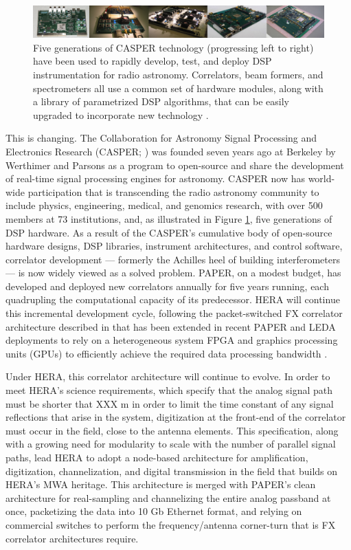 \documentclass[preprint]{aastex}
\begin{document}
\begin{figure}[!ht]\centering
\includegraphics[width=6.5in]{plots/casper_boards.jpg}
\caption{
Five generations of CASPER technology (progressing left to right) have been used to rapidly
develop, test, and deploy DSP instrumentation for radio astronomy.  Correlators,
beam formers, and spectrometers all use a common set of hardware modules, along with a library
of parametrized DSP algorithms, that can be easily upgraded to incorporate new technology
\citep{parsons_et_al2006,parsons_et_al2008}.
}\label{fig:casper_boards}
\end{figure}

This is changing.  The Collaboration for Astronomy Signal Processing and Electronics Research
(CASPER; \citealt{parsons_et_al2006}) was founded seven years ago at Berkeley
by Werthimer and Parsons as a program 
to open-source and share the development of real-time signal processing engines for astronomy.
CASPER now has world-wide participation that is
transcending the radio astronomy community to include physics, engineering,
medical, and genomics research, with
over 500 members at 73 institutions, and, as illustrated in
Figure \ref{fig:casper_boards}, five generations of DSP hardware.
As a result of the CASPER's cumulative body of open-source hardware designs, DSP libraries, instrument
architectures, and control software,
correlator development --- formerly the Achilles heel of building interferometers ---
is now widely viewed as a solved problem.  PAPER, on a modest budget, has developed and deployed new correlators
annually for five years running, each quadrupling the computational capacity of its predecessor.
HERA will continue this incremental development cycle, following the packet-switched
FX correlator architecture described in \citet{parsons_et_al2008} that has been
extended in recent PAPER and LEDA deployments to rely on a heterogeneous system FPGA and graphics processing units (GPUs)
to efficiently achieve the required data processing bandwidth \citep{clark_et_al2012}.

Under HERA, this correlator architecture will continue to evolve.  In order to meet HERA's science requirements,
which specify that the analog signal path must be shorter that XXX m in order to limit the time constant of any signal reflections
that arise in the system, digitization at the front-end of the correlator must occur in the field, close to the antenna
elements.  This specification, along with a growing need for modularity to scale with the number of parallel signal paths,
lead HERA to adopt a node-based architecture for amplification, digitization, channelization, and digital
transmission in the field that builds on HERA's MWA heritage.  This architecture is merged with PAPER's clean 
architecture for real-sampling and channelizing the entire analog passband at once, packetizing the data into
10 Gb Ethernet format, and relying on commercial switches to perform the frequency/antenna corner-turn that is
FX correlator architectures require. 
\end{document}
